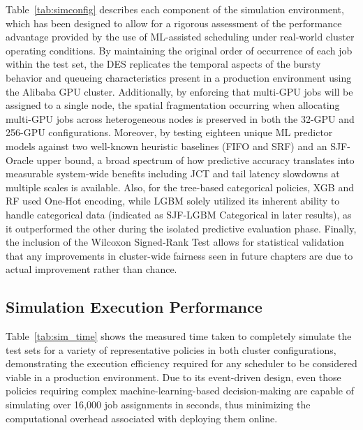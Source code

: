\clearpage
Table~\ref{tab:simconfig} describes each component of the simulation environment, which has been designed to allow for a rigorous assessment of the performance advantage provided by the use of ML-assisted scheduling under real-world cluster operating conditions. By maintaining the original order of occurrence of each job within the test set, the DES replicates the temporal aspects of the bursty behavior and queueing characteristics present in a production environment using the Alibaba GPU cluster. Additionally, by enforcing that multi-GPU jobs will be assigned to a single node, the spatial fragmentation occurring when allocating multi-GPU jobs across heterogeneous nodes is preserved in both the 32-GPU and 256-GPU configurations. Moreover, by testing eighteen unique ML predictor models against two well-known heuristic baselines (FIFO and SRF) and an SJF-Oracle upper bound, a broad spectrum of how predictive accuracy translates into measurable system-wide benefits including JCT and tail latency slowdowns at multiple scales is available. Also, for the tree-based categorical policies, XGB and RF used One-Hot encoding, while LGBM solely utilized its inherent ability to handle categorical data (indicated as SJF-LGBM Categorical in later results), as it outperformed the other during the isolated predictive evaluation phase. Finally, the inclusion of the Wilcoxon Signed-Rank Test allows for statistical validation that any improvements in cluster-wide fairness seen in future chapters are due to actual improvement rather than chance.

\clearpage
\subsection{Simulation Execution Performance}

Table~\ref{tab:sim_time} shows the measured time taken to completely simulate the test sets for a variety of representative policies in both cluster configurations, demonstrating the execution efficiency required for any scheduler to be considered viable in a production environment. Due to its event-driven design, even those policies requiring complex machine-learning-based decision-making are capable of simulating over 16{,}000 job assignments in seconds, thus minimizing the computational overhead associated with deploying them online.

